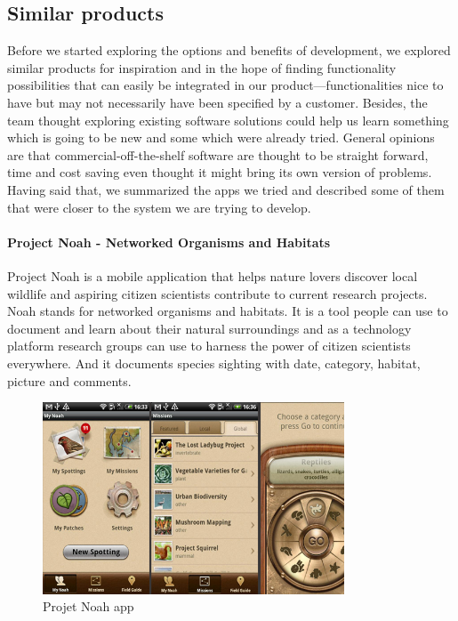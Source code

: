 \subsection{Similar products}
Before we started exploring the options and benefits of development, we explored similar products for inspiration and in the hope of finding functionality possibilities that can easily be integrated in our product---functionalities nice to have but may not necessarily have been specified by a customer. Besides, the team thought exploring existing software solutions could help us learn something which is going to be new and some which were already tried. General opinions are that commercial-off-the-shelf software are thought to be straight forward, time and cost saving even thought it might bring its own version of problems\cite{similarproduct:introdn}. Having said that, we summarized the apps we tried and described some of them that were closer to the system we are trying to develop.
\paragraph{Project Noah - Networked Organisms and Habitats}

Project Noah is a mobile application that helps nature lovers discover local wildlife and aspiring citizen scientists contribute to current research  projects. Noah stands for networked organisms and habitats. It is a tool people can use to document and learn about their  natural surroundings and as a technology platform research groups can  use to harness the power of citizen scientists everywhere. And it documents species sighting with date, category, habitat, picture and comments\cite{similarproduct:noah}.

\begin{figure}[htb]
    \centering
    \includegraphics[width=0.8\textwidth]{introduction/project_description/noah.png}
    \caption{Projet Noah app}
    \label{fig:Noahapp}
\end{figure}
\
